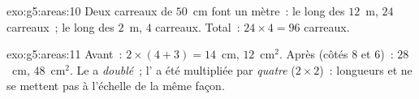 \begin{solution}{exo:g5:areas:10}
Deux carreaux de $50$~cm font un mètre~: le long des $12$~m,
$24$ carreaux~; le long des $2$~m, $4$ carreaux. Total~:
$24 \times 4 = 96$ carreaux.
\end{solution}

\begin{solution}{exo:g5:areas:11}
Avant~:  $2 \times (4 + 3) = 14$~cm,  $12$~cm$^2$.
Après (côtés $8$ et $6$)~:  $28$~cm,  $48$~cm$^2$.
Le  a \emph{doublé}~; l' a été multipliée par
\emph{quatre} ($2 \times 2$)~: longueurs et  ne se mettent pas
à l'échelle de la même façon.
\end{solution}
